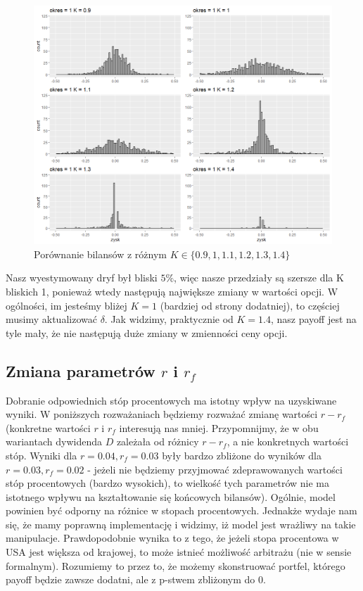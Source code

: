 \documentclass[12pt]{article}
\begin{document}
\begin{figure}[ht!]
\centering
\includegraphics[width=\linewidth]{bilanse_gold_ciekawe_K.png}
\caption{Porównanie bilansów z różnym  $K \in \{0.9, 1, 1.1, 1.2, 1.3, 1.4\}$}
\end{figure}

Nasz wyestymowany dryf był bliski $5\%$, więc nasze przedziały są szersze dla K bliskich 1, ponieważ wtedy następują największe zmiany w wartości opcji. W ogólności, im jesteśmy bliżej $K=1$ (bardziej od strony dodatniej), to częściej musimy aktualizować $\delta$. Jak widzimy, praktycznie od $K=1.4$, nasz payoff jest na tyle mały, że nie następują duże zmiany w zmienności ceny opcji.


\newpage
\subsection{Zmiana parametrów $r$ i $r_f$}

Dobranie odpowiednich stóp procentowych ma istotny wpływ na uzyskiwane wyniki. W poniższych rozważaniach będziemy rozważać zmianę wartości $r - r_f$ (konkretne wartości $r$ i $r_f$ interesują nas mniej. Przypomnijmy, że w obu wariantach dywidenda $D$ zależała od różnicy $r - r_f$, a nie konkretnych wartości stóp. Wyniki dla $r=0.04, r_f=0.03$ były bardzo zbliżone do wyników dla $r=0.03, r_f=0.02$ - jeżeli nie będziemy przyjmować zdeprawowanych wartości stóp procentowych (bardzo wysokich), to wielkość tych parametrów nie ma istotnego wpływu na kształtowanie się końcowych bilansów). Ogólnie, model powinien być odporny na różnice w stopach procentowych. Jednakże wydaje nam się, że mamy poprawną implementację i widzimy, iż model jest wrażliwy na takie manipulacje. Prawdopodobnie wynika to z tego, że jeżeli stopa procentowa w USA jest większa od krajowej, to może istnieć możliwość arbitrażu (nie w sensie formalnym). Rozumiemy to przez to, że możemy skonstruować portfel, którego payoff będzie zawsze dodatni, ale z p-stwem zbliżonym do $0$.
\end{document}
